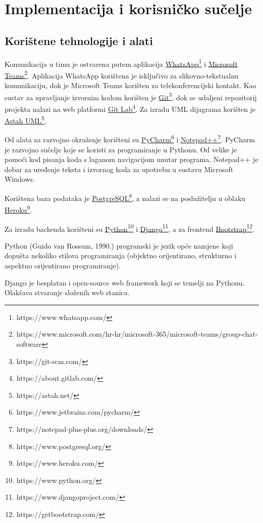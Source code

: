 \chapter{Implementacija i korisničko sučelje}
		
		
		\section{Korištene tehnologije i alati}
		
			
			\noindent Komunikacija u timu je ostvarena putem aplikacija \underline{WhatsApp}\footnote{https://www.whatsapp.com/} i \underline{Microsoft Teams}\footnote{https://www.microsoft.com/hr-hr/microsoft-365/microsoft-teams/group-chat-software}. Aplikacija WhatsApp korištena je isključivo za slikovno-tekstualnu komunikaciju, dok je Microsoft Teams korišten za telekonferencijski kontakt. Kao sustav za upravljanje izvornim kodom korišten je \underline{Git}\footnote{https://git-scm.com/}, dok se udaljeni repozitorij projekta nalazi na web platformi \underline{Git Lab}\footnote{https://about.gitlab.com/}. Za izradu UML dijagrama korišten je \underline{Astah UML}\footnote{https://astah.net/}.
			
			\noindent Od alata za razvojno okruženje korišteni su \underline{PyCharm}\footnote{https://www.jetbrains.com/pycharm/} i \underline{Notepad++}\footnote{https://notepad-plus-plus.org/downloads/}. PyCharm je razvojno sučelje koje se koristi za programiranje u Pythonu. Od velike je pomoći kod pisanja koda s laganom navigacijom unutar programa. Notepad++ je dobar za uređenje teksta i izvornog koda za upotrebu u sustavu Microsoft Windows.
			
			\noindent Korištena baza podataka je \underline{PostgreSQL}\footnote{https://www.postgresql.org/}, a nalazi se na poslužitelju u oblaku \underline{Heroku}\footnote{https://www.heroku.com/}.
			
			\noindent Za izradu backenda korišteni su \underline{Python}\footnote{https://www.python.org/} i \underline{Django}\footnote{https://www.djangoproject.com/}, a za frontend \underline{Bootstrap}\footnote{https://getbootstrap.com/}.
			
			\noindent Python (Guido van Rossum, 1990.) programski je jezik opće namjene koji dopušta nekoliko stilova programiranja (objektno orijentirano, strukturno i aspektno orijentirano programiranje).
			
			\noindent Django je besplatan i open-source web framework koji se temelji na Pythonu. Olakšava stvaranje složenih web stanica.
			
